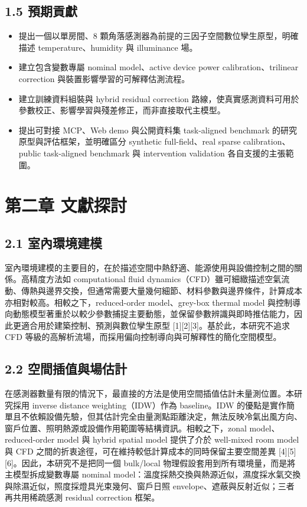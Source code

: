 \documentclass[12pt,a4paper]{article}
\begin{document}
\subsection*{1.5 預期貢獻}

\begin{itemize}
\item 提出一個以單房間、8 顆角落感測器為前提的三因子空間數位孿生原型，明確描述 temperature、humidity 與 illuminance 場。
\item 建立包含變數專屬 nominal model、active device power calibration、trilinear correction 與裝置影響學習的可解釋估測流程。
\item 建立訓練資料組裝與 hybrid residual correction 路線，使真實感測資料可用於參數校正、影響學習與殘差修正，而非直接取代主模型。
\item 提出可對接 MCP、Web demo 與公開資料集 task-aligned benchmark 的研究原型與評估框架，並明確區分 synthetic full-field、real sparse calibration、public task-aligned benchmark 與 intervention validation 各自支援的主張範圍。
\end{itemize}

\clearpage

\section*{第二章 文獻探討}

\subsection*{2.1 室內環境建模}

室內環境建模的主要目的，在於描述空間中熱舒適、能源使用與設備控制之間的關係。高精度方法如 computational fluid dynamics（CFD）雖可細緻描述空氣流動、傳熱與邊界交換，但通常需要大量幾何細節、材料參數與邊界條件，計算成本亦相對較高。相較之下，reduced-order model、grey-box thermal model 與控制導向動態模型著重於以較少參數捕捉主要動態，並保留參數辨識與即時推估能力，因此更適合用於建築控制、預測與數位孿生原型 [1][2][3]。基於此，本研究不追求 CFD 等級的高解析流場，而採用偏向控制導向與可解釋性的簡化空間模型。


\subsection*{2.2 空間插值與場估計}

在感測器數量有限的情況下，最直接的方法是使用空間插值估計未量測位置。本研究採用 inverse distance weighting（IDW）作為 baseline。IDW 的優點是實作簡單且不依賴設備先驗，但其估計完全由量測點距離決定，無法反映冷氣出風方向、窗戶位置、照明熱源或設備作用範圍等結構資訊。相較之下，zonal model、reduced-order model 與 hybrid spatial model 提供了介於 well-mixed room model 與 CFD 之間的折衷途徑，可在維持較低計算成本的同時保留主要空間差異 [4][5][6]。因此，本研究不是把同一個 bulk/local 物理假設套用到所有環境量，而是將主模型拆成變數專屬 nominal model：溫度採熱交換與熱源近似，濕度採水氣交換與除濕近似，照度採燈具光束幾何、窗戶日照 envelope、遮蔽與反射近似；三者再共用稀疏感測 residual correction 框架。
\end{document}
